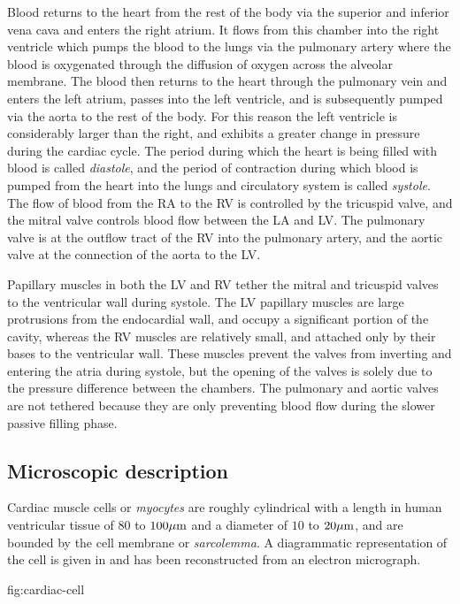 Blood returns to the heart from the rest of the body via the superior and
inferior vena cava and enters the right atrium.  It flows from this chamber
into the right ventricle which pumps the blood to the lungs via the pulmonary
artery where the blood is oxygenated through the diffusion of oxygen across
the alveolar membrane.  The blood then returns to the heart through the
pulmonary vein and enters the left atrium, passes into the left ventricle, and
is subsequently pumped via the aorta to the rest of the body.  For this reason
the left ventricle is considerably larger than the right, and exhibits a
greater change in pressure during the cardiac cycle.  The period during which
the heart is being filled with blood is called \emph{diastole}, and the period
of contraction during which blood is pumped from the heart into the lungs and
circulatory system is called \emph{systole}.  The flow of blood from the RA to
the RV is controlled by the tricuspid valve, and the mitral valve controls
blood flow between the LA and LV.  The pulmonary valve is at the outflow tract
of the RV into the pulmonary artery, and the aortic valve at the connection of
the aorta to the LV.

Papillary muscles in both the LV and RV tether the mitral and tricuspid valves
to the ventricular wall during systole.  The LV papillary muscles are large
protrusions from the endocardial wall, and occupy a significant portion of the
cavity, whereas the RV muscles are relatively small, and attached only by
their bases to the ventricular wall.  These muscles prevent the valves from
inverting and entering the atria during systole, but the opening of the valves
is solely due to the pressure difference between the chambers.  The pulmonary
and aortic valves are not tethered because they are only preventing blood flow
during the slower passive filling phase.

\subsection{Microscopic description}
\label{sec:microstructure}

Cardiac muscle cells or \emph{myocytes} are roughly cylindrical with a length
in human ventricular tissue of $80$ to $100 \mathrm{\mu m}$ and a diameter of $10$ to $20
\mathrm{\mu m}$, and are bounded by the cell membrane or \emph{sarcolemma}.  A
diagrammatic representation of the cell is given in 
and has been reconstructed from an electron micrograph.

 {fig:cardiac-cell}{}

